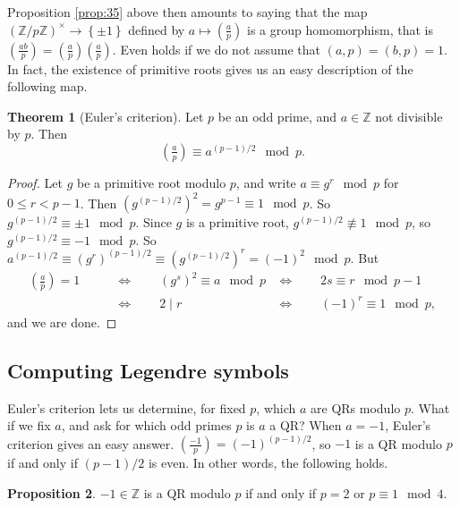 \documentclass{article}
\newcommand{\Z}{\mathbb{Z}}
\newcommand{\rb}[1]{\left( #1 \right)}
\newcommand{\cb}[1]{\left\{ #1 \right\}}
\newcommand{\unit}[1]{\rb{\Z / #1\Z}^\times}
\newcommand{\legendre}[2]{\rb{\tfrac{#1}{#2}}}
\theoremstyle{definition}\newtheorem{definition}{Definition}
\theoremstyle{definition}\newtheorem*{remark}{Remark}
\theoremstyle{definition}\newtheorem*{example}{Example}
\theoremstyle{definition}\newtheorem*{note}{Note}
\newtheorem{proposition}[definition]{Proposition}
\newtheorem{theorem}[definition]{Theorem}
\begin{document}
Proposition \ref{prop:35} above then amounts to saying that the map $ \unit{p} \to \cb{\pm 1} $ defined by $ a \mapsto \legendre{a}{p} $ is a group homomorphism, that is $ \legendre{ab}{p} = \legendre{a}{p}\legendre{a}{p} $. Even holds if we do not assume that $ \rb{a, p} = \rb{b, p} = 1 $. In fact, the existence of primitive roots gives us an easy description of the following map.


\begin{theorem}[Euler's criterion]
Let $ p $ be an odd prime, and $ a \in \Z $ not divisible by $ p $. Then
$$ \legendre{a}{p} \equiv a^{\rb{p - 1} / 2} \mod p. $$
\end{theorem}

\begin{proof}
Let $ g $ be a primitive root modulo $ p $, and write $ a \equiv g^r \mod p $ for $ 0 \le r < p - 1 $. Then $ \rb{g^{\rb{p - 1} / 2}}^2 = g^{p - 1} \equiv 1 \mod p $. So $ g^{\rb{p - 1} / 2} \equiv \pm 1 \mod p $. Since $ g $ is a primitive root, $ g^{\rb{p - 1} / 2} \not\equiv 1 \mod p $, so $ g^{\rb{p - 1} / 2} \equiv -1 \mod p $. So $ a^{\rb{p - 1} / 2} \equiv \rb{g^r}^{\rb{p - 1} / 2} \equiv \rb{g^{\rb{p - 1} / 2}}^r = \rb{-1}^2 \mod p $. But
\begin{align*}
\legendre{a}{p} = 1 \qquad
& \iff \qquad \rb{g^s}^2 \equiv a \mod p
& \iff \qquad 2s \equiv r \mod p - 1 \\
& \iff \qquad 2 \mid r
& \iff \qquad \rb{-1}^r \equiv 1 \mod p,
\end{align*}
and we are done.
\end{proof}

\subsection{Computing Legendre symbols}

Euler's criterion lets us determine, for fixed $ p $, which $ a $ are QRs modulo $ p $. What if we fix $ a $, and ask for which odd primes $ p $ is $ a $ a QR? When $ a = -1 $, Euler's criterion gives an easy answer. $ \legendre{-1}{p} = \rb{-1}^{\rb{p - 1} / 2} $, so $ -1 $ is a QR modulo $ p $ if and only if $ \rb{p - 1} / 2 $ is even. In other words, the following holds.

\begin{proposition}
$ -1 \in \Z $ is a QR modulo $ p $ if and only if $ p = 2 $ or $ p \equiv 1 \mod 4 $.
\end{proposition}
\end{document}
